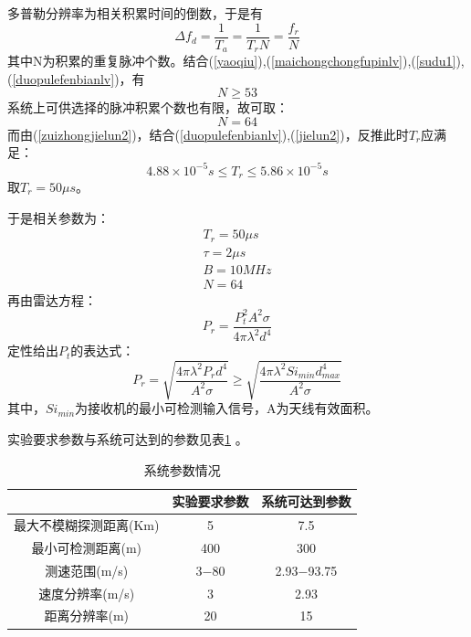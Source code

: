 \documentclass[12pt]{article}
\begin{document}
\par
多普勒分辨率为相关积累时间的倒数，于是有
\begin{equation}\label{duopulefenbianlv}
\Delta f_d=\frac{1}{T_a}=\frac{1}{T_rN}=\frac{f_r}{N}
\end{equation}
其中N为积累的重复脉冲个数。结合(\ref{yaoqiu}),(\ref{maichongchongfupinlv}),(\ref{sudu1}),(\ref{duopulefenbianlv})，有
\begin{equation}\label{chongfugeshu1}
N\geq 53
\end{equation}
系统上可供选择的脉冲积累个数也有限，故可取：
\begin{equation}\label{zuizhongjielun2}
N=64
\end{equation}
而由(\ref{zuizhongjielun2})，结合(\ref{duopulefenbianlv}),(\ref{jielun2})，反推此时$T_r$应满足：
\begin{equation}\label{zuizhongjielun3}
4.88\times 10^{-5}s \leq T_r\leq 5.86\times 10^{-5} s
\end{equation}
取$T_r=50\mu s$。\par 于是相关参数为：
\begin{equation}\label{leidafangcheng}
\begin{array}{c}
  T_r=50\mu s\\
  \tau =2\mu s\\
  B=10MHz\\
  N=64
\end{array}
\end{equation}
再由雷达方程：
\begin{equation}\label{leidafangcheng}
P_r=\frac{P_t^2A^2\sigma}{4\pi\lambda^2d^4}
\end{equation}
定性给出$P_t$的表达式：
\begin{equation}\label{leidafangcheng}
P_r=\sqrt{\frac{4\pi\lambda^2 P_rd^4}{A^2\sigma}}\geq \sqrt{\frac{4\pi\lambda^2 Si_{min}d_{max}^4}{A^2\sigma}}
\end{equation}
其中，$Si_{min}$为接收机的最小可检测输入信号，A为天线有效面积。
\par
实验要求参数与系统可达到的参数见表\ref{tab:xtcsqk}
。
\begin{table}[htbp]
  \centering
  \caption{系统参数情况}
    \begin{tabular}{|c|c|c|}
    \hline
      & 实验要求参数 & 系统可达到参数 \\
    \hline
    最大不模糊探测距离(Km) & 5 & 7.5 \\
    \hline
    最小可检测距离(m) & 400 & 300 \\
    \hline
    测速范围(m/s) & 3$-$80 & 2.93$-$93.75 \\
    \hline
    速度分辨率(m/s) & 3 & 2.93 \\
    \hline
    距离分辨率(m) & 20 & 15 \\
    \hline
    \end{tabular}%
  \label{tab:xtcsqk}%
\end{table}%
\end{document}
